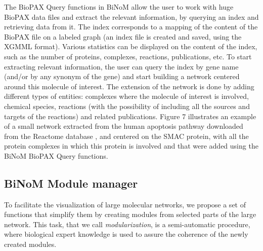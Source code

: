 \documentclass[10pt]{bmc_article}
\newenvironment{bmcformat}{\baselineskip20pt\sloppy\setboolean{publ}{false}}{\baselineskip20pt\sloppy}
\begin{document}
\begin{bmcformat}


The BioPAX Query functions in BiNoM allow the user to work with huge
BioPAX data files and extract the relevant information, by querying an index and
retrieving data from it. The index corresponds to a mapping of the content of
the BioPAX file on a labeled graph (an index file is created and saved, using
the XGMML format). Various statistics can be displayed on the content of the
index, such as the number of proteins, complexes, reactions, publications, etc.
To start extracting relevant information, the user can query the index by gene
name (and/or by any synonym of the gene) and start building a network centered
around this molecule of interest. The extension of the network is done by adding
different types of entities: complexes where the molecule of interest is
involved, chemical species, reactions (with the possibility of including all the
sources and targets of the reactions) and related publications. Figure 7
illustrates an example of a small network extracted from the human apoptosis
pathway downloaded from the Reactome database \cite{joshi2005reactome}, and
centered on the SMAC protein, with all the protein complexes in which
this protein is involved and that were added using the BiNoM BioPAX Query functions.


\subsection*{BiNoM Module manager}

To facilitate the visualization of large molecular networks, we propose a set of
functions that simplify them by creating modules from selected parts of the
large network. This task, that we call \emph{modularization}, is a
semi-automatic procedure, where biological expert knowledge is used to assure
the coherence of the newly created modules.


\end{bmcformat}
\end{document}
